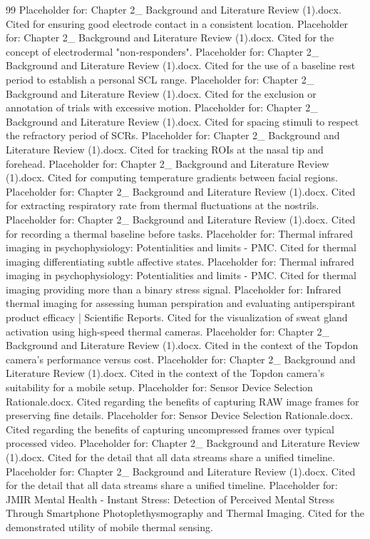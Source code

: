 \documentclass{article}
\begin{document}
\begin{thebibliography}{99}
         Placeholder for: Chapter 2\_ Background and Literature Review (1).docx. Cited for ensuring good electrode contact in a consistent location.
         Placeholder for: Chapter 2\_ Background and Literature Review (1).docx. Cited for the concept of electrodermal "non-responders".
         Placeholder for: Chapter 2\_ Background and Literature Review (1).docx. Cited for the use of a baseline rest period to establish a personal SCL range.
         Placeholder for: Chapter 2\_ Background and Literature Review (1).docx. Cited for the exclusion or annotation of trials with excessive motion.
         Placeholder for: Chapter 2\_ Background and Literature Review (1).docx. Cited for spacing stimuli to respect the refractory period of SCRs.
         Placeholder for: Chapter 2\_ Background and Literature Review (1).docx. Cited for tracking ROIs at the nasal tip and forehead.
         Placeholder for: Chapter 2\_ Background and Literature Review (1).docx. Cited for computing temperature gradients between facial regions.
         Placeholder for: Chapter 2\_ Background and Literature Review (1).docx. Cited for extracting respiratory rate from thermal fluctuations at the nostrils.
         Placeholder for: Chapter 2\_ Background and Literature Review (1).docx. Cited for recording a thermal baseline before tasks.
         Placeholder for: Thermal infrared imaging in psychophysiology: Potentialities and limits - PMC. Cited for thermal imaging differentiating subtle affective states.
         Placeholder for: Thermal infrared imaging in psychophysiology: Potentialities and limits - PMC. Cited for thermal imaging providing more than a binary stress signal.
         Placeholder for: Infrared thermal imaging for assessing human perspiration and evaluating antiperspirant product efficacy | Scientific Reports. Cited for the visualization of sweat gland activation using high-speed thermal cameras.
         Placeholder for: Chapter 2\_ Background and Literature Review (1).docx. Cited in the context of the Topdon camera's performance versus cost.
         Placeholder for: Chapter 2\_ Background and Literature Review (1).docx. Cited in the context of the Topdon camera's suitability for a mobile setup.
         Placeholder for: Sensor Device Selection Rationale.docx. Cited regarding the benefits of capturing RAW image frames for preserving fine details.
         Placeholder for: Sensor Device Selection Rationale.docx. Cited regarding the benefits of capturing uncompressed frames over typical processed video.
         Placeholder for: Chapter 2\_ Background and Literature Review (1).docx. Cited for the detail that all data streams share a unified timeline.
         Placeholder for: Chapter 2\_ Background and Literature Review (1).docx. Cited for the detail that all data streams share a unified timeline.
         Placeholder for: JMIR Mental Health - Instant Stress: Detection of Perceived Mental Stress Through Smartphone Photoplethysmography and Thermal Imaging. Cited for the demonstrated utility of mobile thermal sensing.
    \end{thebibliography}
\end{document}
